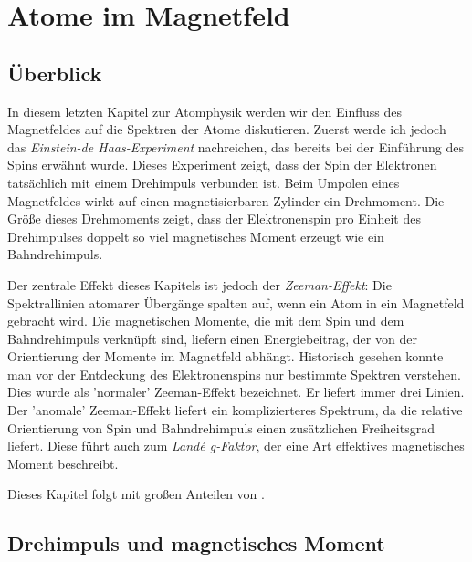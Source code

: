 \renewcommand{\lastmod}{3. Dezember 2024}
\renewcommand{\chapterauthors}{Markus Lippitz}

\chapter{Atome im Magnetfeld}






\section{Überblick}

In diesem letzten Kapitel zur Atomphysik werden wir den Einfluss des Magnetfeldes auf die Spektren der Atome diskutieren. Zuerst werde ich jedoch das \emph{Einstein-de Haas-Experiment} nachreichen, das bereits bei der Einführung des Spins erwähnt wurde. Dieses Experiment zeigt, dass der Spin der Elektronen tatsächlich mit einem Drehimpuls verbunden ist. Beim Umpolen eines Magnetfeldes wirkt auf einen magnetisierbaren Zylinder ein Drehmoment. Die Größe dieses Drehmoments zeigt, dass der Elektronenspin pro Einheit des Drehimpulses doppelt so viel magnetisches Moment erzeugt wie ein Bahndrehimpuls.

Der zentrale Effekt dieses Kapitels ist jedoch der \emph{Zeeman-Effekt}: Die Spektrallinien atomarer Übergänge spalten auf, wenn ein Atom in ein Magnetfeld gebracht wird. Die magnetischen Momente, die mit dem Spin und dem Bahndrehimpuls verknüpft sind, liefern einen Energiebeitrag, der von der Orientierung der Momente im Magnetfeld abhängt. Historisch gesehen konnte man vor der Entdeckung des Elektronenspins nur bestimmte Spektren verstehen. Dies wurde als 'normaler' Zeeman-Effekt bezeichnet. Er liefert immer drei Linien. Der 'anomale' Zeeman-Effekt liefert ein komplizierteres Spektrum, da die relative Orientierung von Spin und Bahndrehimpuls einen zusätzlichen Freiheitsgrad liefert. Diese führt auch zum \emph{Landé g-Faktor}, der eine Art effektives magnetisches Moment beschreibt.

Dieses Kapitel folgt \cite{Harris_moderne_Physik} mit großen Anteilen von \cite{Demtröder_ep3}.





\section{Drehimpuls und magnetisches Moment}

